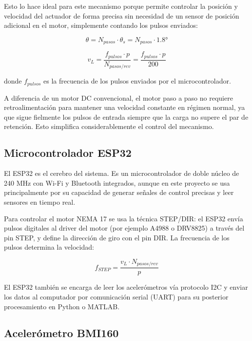 Esto lo hace ideal para este mecanismo porque permite controlar la posición y velocidad
del actuador de forma precisa sin necesidad de un sensor de posición adicional en el motor,
simplemente contando los pulsos enviados:

\begin{equation}
	\theta = N_{pasos} \cdot \theta_s = N_{pasos} \cdot 1.8°
\end{equation}

\begin{equation}
	v_L = \frac{f_{pulsos} \cdot p}{N_{pasos/rev}}
	= \frac{f_{pulsos} \cdot p}{200}
\end{equation}

donde $f_{pulsos}$ es la frecuencia de los pulsos enviados por el microcontrolador.

A diferencia de un motor DC convencional, el motor paso a paso no requiere retroalimentación
para mantener una velocidad constante en régimen normal, ya que sigue fielmente los pulsos
de entrada siempre que la carga no supere el par de retención. Esto simplifica considerablemente
el control del mecanismo.

\subsection{Microcontrolador ESP32}

El ESP32 es el cerebro del sistema. Es un microcontrolador de doble núcleo de 240 MHz con
Wi-Fi y Bluetooth integrados, aunque en este proyecto se usa principalmente por su capacidad
de generar señales de control precisas y leer sensores en tiempo real.

Para controlar el motor NEMA 17 se usa la técnica STEP/DIR: el ESP32 envía pulsos digitales
al driver del motor (por ejemplo A4988 o DRV8825) a través del pin STEP, y define la
dirección de giro con el pin DIR. La frecuencia de los pulsos determina la velocidad:

\begin{equation}
	f_{STEP} = \frac{v_L \cdot N_{pasos/rev}}{p}
\end{equation}

El ESP32 también se encarga de leer los acelerómetros vía protocolo I2C y enviar los datos
al computador por comunicación serial (UART) para su posterior procesamiento en Python o MATLAB.

\subsection{Acelerómetro BMI160}

